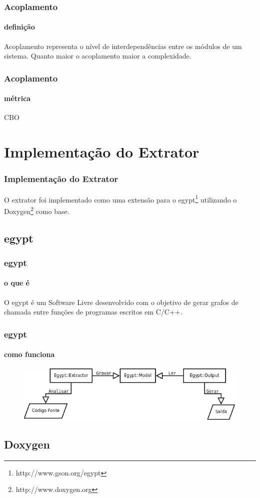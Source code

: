 \documentclass{beamer}
\begin{document}
\begin{frame}
\frametitle{Acoplamento}
\framesubtitle{definição}
Acoplamento representa o nível de interdependências entre os módulos de um
sistema. Quanto maior o acoplamento maior a complexidade.
\end{frame}

\begin{frame}
\frametitle{Acoplamento}
\framesubtitle{métrica}
CBO
\end{frame}

\section{Implementação do Extrator}

\begin{frame}
\frametitle{Implementação do Extrator}
 O extrator foi implementado como uma extensão para o
 egypt\footnote{http://www.gson.org/egypt} utilizando o
 Doxygen\footnote{http://www.doxygen.org} como base.
\end{frame}

\subsection{egypt}

\begin{frame}
\frametitle{egypt}
\framesubtitle{o que é}
 O egypt é um Software Livre desenvolvido com o objetivo de gerar grafos de
 chamada entre funções de programas escritos em C/C++.
\end{frame}

\begin{frame}
\frametitle{egypt}
\framesubtitle{como funciona}
 \begin{figure}[h]
 \center
 \includegraphics[scale=0.3]{imagens/egypt-fluxogram}
 \label{fig:egypt-fluxogram}
 \end{figure}
\end{frame}

\subsection{Doxygen}
\end{document}
